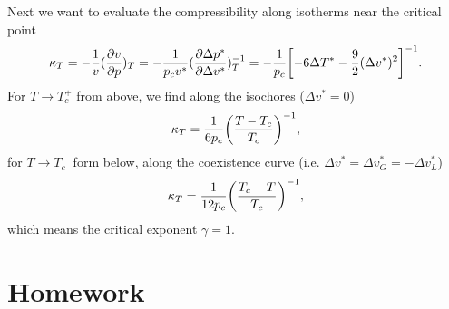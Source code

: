 \documentclass[10pt]{article}
\begin{document}
	Next we want to evaluate the compressibility along isotherms near the critical point
	\begin{equation}
		\kappa_T = -\frac{1}{v} (\pdv{v}{p})_T = - \frac{1}{p_c v^*} (\pdv{\Delta p^*}{\Delta v^*})^{-1}_T = -\frac{1}{p_c}\qty[-6 \Delta T^* - \frac{9}{2}(\Delta v^*)^2]^{-1}.
	\end{equation}
	For $T \to T_c^+$ from above, we find along the isochores ($\Delta v^* = 0$)
	\begin{equation}
		\kappa_T = \frac{1}{6 p_c} \qty(\frac{T-T_c}{T_c})^{-1},
	\end{equation}
	for $T \to T_c^-$ form below, along the coexistence curve (i.e. $\Delta v^* = \Delta v^*_{G} = -\Delta v^*_{L}$)
	\begin{equation}
		\kappa_T = \frac{1}{12 p_c} \qty(\frac{T_c-T}{T_c})^{-1},
	\end{equation}
	which means the critical exponent $\gamma = 1$.


	\newpage

	\section{Homework}\label{sec: homework}
\end{document}
